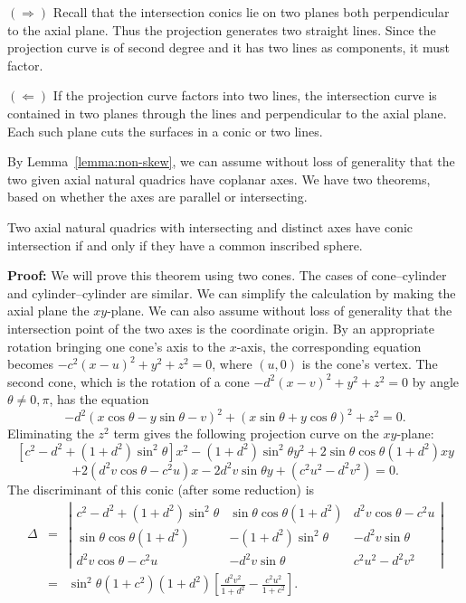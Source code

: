      $(\Rightarrow)$ Recall that the intersection conics lie on two
planes both perpendicular to the axial plane.  Thus the projection generates
two straight lines.  Since the projection curve is of second degree and it
has two lines as components, it must factor.

     $(\Leftarrow)$ If the projection curve factors into two lines,
the intersection curve is contained in two planes through the lines and
perpendicular to the axial plane.  Each such plane cuts the surfaces
in a conic or two lines. \QED

     By Lemma~\ref{lemma:non-skew}, we can assume without loss of generality
that the two given axial natural quadrics have coplanar axes.
We have two theorems, based on whether the axes are parallel or intersecting.

\begin{theorem}
\label{theorem:intersecting}
     Two axial natural quadrics with intersecting and distinct axes have
conic intersection if and only if they have a common inscribed sphere.
\end{theorem}
{\bf Proof:}
We will prove this theorem using two
cones.  The cases of cone--cylinder and cylinder--cylinder are similar.
We can simplify the calculation by making the axial plane the $xy$-plane.
We can also assume without loss of generality that the intersection point of
the two axes is the coordinate origin.
By an appropriate rotation bringing one cone's axis to the $x$-axis,
the corresponding equation becomes $-c^2(x-u)^2+y^2+z^2=0$, where $(u,0)$ is
the cone's vertex.  The second cone, which is the rotation of a cone
$-d^2(x-v)^2+y^2+z^2=0$ by angle $\theta\neq 0,\pi$, has the equation
\[ -d^2(x\cos\theta-y\sin\theta-v)^2+(x\sin\theta+y\cos\theta)^2+z^2=0. \]
Eliminating the $z^2$ term gives the following projection curve on the
$xy$-plane:
\[ [c^2-d^2+(1+d^2)\sin^2\theta]x^2-(1+d^2)\sin^2\theta y^2
   +2\sin\theta\cos\theta(1+d^2)xy \]
\[ +2(d^2v\cos\theta-c^2u)x
   -2d^2v\sin\theta y+(c^2u^2-d^2v^2)=0.                      \]
The discriminant of this conic (after some reduction) is
\begin{eqnarray*}
\Delta&=&\left| \begin{array}{ccc}
     c^2-d^2+(1+d^2)\sin^2\theta & \sin\theta\cos\theta(1+d^2) &
                     d^2v\cos\theta-c^2u \\
     \sin\theta\cos\theta(1+d^2) & -(1+d^2)\sin^2\theta & -d^2v\sin\theta \\
     d^2v\cos\theta-c^2u & -d^2v\sin\theta & c^2u^2-d^2v^2
                 \end{array} \right| \\
     &=& \sin^2\theta(1+c^2)(1+d^2)\left[
                    \frac{d^2v^2}{1+d^2}-\frac{c^2u^2}{1+c^2}
                       \right].
\end{eqnarray*}
